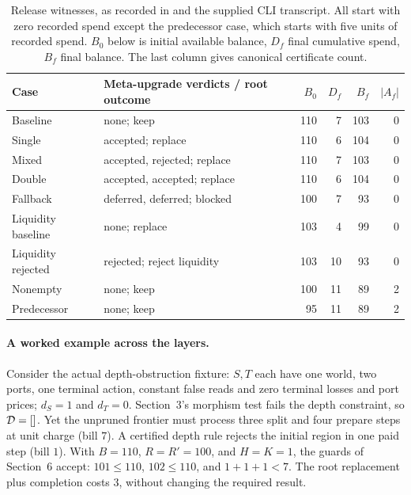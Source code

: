 \begin{table}[htbp]
\centering\small
\caption{Release witnesses, as recorded in  and the supplied CLI transcript. All start with zero recorded spend except the predecessor case, which starts with five units of recorded spend. $B_0$ below is initial available balance, $D_f$ final cumulative spend, $B_f$ final balance. The last column gives canonical certificate count.}\label{tab:release-cases}
\begin{tabularx}{\linewidth}{@{}lXrrrr@{}}\toprule
Case & Meta-upgrade verdicts / root outcome & $B_0$ & $D_f$ & $B_f$ & $|A_f|$\\\midrule
Baseline & none; keep & 110 & 7 & 103 & 0\\
Single & accepted; replace & 110 & 6 & 104 & 0\\
Mixed & accepted, rejected; replace & 110 & 7 & 103 & 0\\
Double & accepted, accepted; replace & 110 & 6 & 104 & 0\\
Fallback & deferred, deferred; blocked & 100 & 7 & 93 & 0\\
Liquidity baseline & none; replace & 103 & 4 & 99 & 0\\
Liquidity rejected & rejected; reject liquidity & 103 & 10 & 93 & 0\\
Nonempty & none; keep & 100 & 11 & 89 & 2\\
Predecessor & none; keep & 95 & 11 & 89 & 2\\\bottomrule
\end{tabularx}
\end{table}

\paragraph{A worked example across the layers.}
Consider the actual depth-obstruction fixture: $S,T$ each have one world, two ports, one terminal action, constant false reads and zero terminal losses and port prices; $d_S=1$ and $d_T=0$. Section~3's morphism test fails the depth constraint, so $\mathcal D=[]$. Yet the unpruned frontier must process three split and four prepare steps at unit charge (bill $7$). A certified depth rule rejects the initial region in one paid step (bill $1$). With $B=110$, $R=R'=100$, and $H=K=1$, the guards of Section~6 accept: $101\le110$, $102\le110$, and $1+1+1<7$. The root replacement plus completion costs $3$, without changing the required result.

